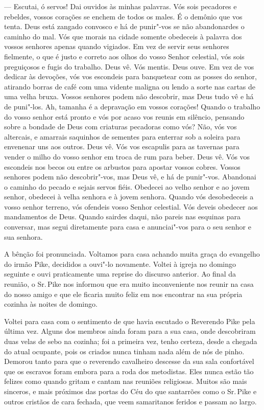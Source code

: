 --- Escutai, ó servos! Dai ouvidos às minhas palavras. Vós sois
pecadores e rebeldes, vossos corações se enchem de todos os males. É o
demônio que vos tenta. Deus está zangado convosco e há de punir"-vos se
não abandonardes o caminho do mal. Vós que morais na cidade somente
obedeceis à palavra dos vossos senhores apenas quando vigiados. Em vez
de servir seus senhores fielmente, o que é justo e correto aos olhos do
vosso Senhor celestial, vós sois preguiçosos e fugis do trabalho. Deus
vê. Vós mentis. Deus ouve. Em vez de vos dedicar às devoções, vós vos
escondeis para banquetear com as posses do senhor, atirando borras de
café com uma vidente maligna ou lendo a sorte nas cartas de uma velha
bruxa. Vossos senhores podem não descobrir, mas Deus tudo vê e há de
puni"-los. Ah, tamanha é a depravação em vossos corações! Quando o
trabalho do vosso senhor está pronto e vós por acaso vos reunis em
silêncio, pensando sobre a bondade de Deus com criaturas pecadoras como
vós? Não, vós vos altercais, e amarrais saquinhos de sementes para
enterrar sob a soleira para envenenar uns aos outros. Deus vê. Vós vos
escapulis para as tavernas para vender o milho do vosso senhor em troca
de rum para beber. Deus vê. Vós vos escondeis nos becos ou entre os
arbustos para apostar vossos cobres. Vossos senhores podem não
descobrir"-vos, mas Deus vê, e há de punir"-vos. Abandonai o caminho do
pecado e sejais servos fiéis. Obedecei ao velho senhor e ao jovem
senhor, obedecei à velha senhora e à jovem senhora. Quando vós
desobedeceis a vosso senhor terreno, vós ofendeis vosso Senhor
celestial. Vós deveis obedecer aos mandamentos de Deus. Quando sairdes
daqui, não pareis nas esquinas para conversar, mas segui diretamente
para casa e anunciai"-vos para o seu senhor e sua senhora.

A bênção foi pronunciada. Voltamos para
casa achando muita graça do evangelho do irmão Pike, decididos a ouvi"-lo
novamente. Voltei à igreja no domingo seguinte e ouvi praticamente uma
reprise do discurso anterior. Ao final da reunião, o Sr.\,Pike nos
informou que era muito inconveniente nos reunir na casa do nosso amigo e
que ele ficaria muito feliz em nos encontrar na sua própria cozinha às
noites de domingo.

Voltei para casa com o sentimento de
que havia escutado o Reverendo Pike pela última vez. Alguns dos membros
ainda foram para a sua casa, onde descobriram duas velas de sebo na
cozinha; foi a primeira vez, tenho certeza, desde a chegada do atual
ocupante, pois os criados nunca tinham nada além de nós de pinho.
Demorou tanto para que o reverendo cavalheiro descesse da sua sala
confortável que os escravos foram embora para a roda dos metodistas.
Eles nunca estão tão felizes como quando gritam e cantam nas reuniões
religiosas. Muitos são mais sinceros, e mais próximos das portas do Céu
do que santarrões como o Sr.\,Pike e outros cristãos de cara fechada, que
veem samaritanos feridos e passam ao largo.

